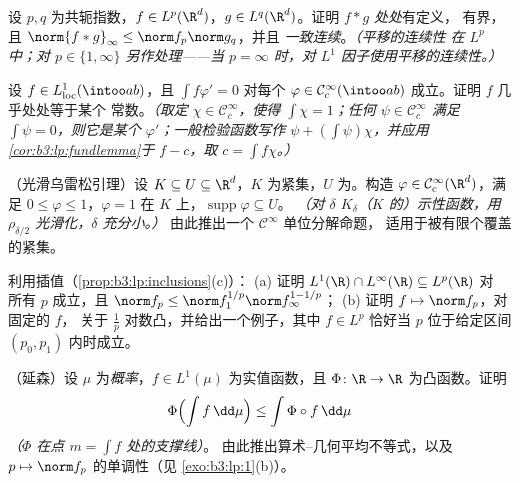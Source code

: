 \begin{exercise}[$\star\star$]\label{exo:b3:lp:6}
设 $p, q$ 为共轭指数，$f \in L^p(\R^d)$，$g \in
L^q(\R^d)$。证明 $f * g$ \emph{处处}有定义，
有界，且 $\norm{f*g}_\infty \leq \norm f_p\norm g_q$，并且
\emph{一致连续}。\emph{（平移的连续性
在 $L^p$ 中；对 $p \in \{1, \infty\}$ 另作处理——当 $p =
\infty$ 时，对 $L^1$ 因子使用平移的连续性。）}
\end{exercise}

\begin{exercise}[$\star\star$]\label{exo:b3:lp:7}
设 $f \in L^1_{\mathrm{loc}}(\intoo ab)$，且
$\int f\varphi' = 0$ 对每个 $\varphi \in \mathcal
C^\infty_c(\intoo ab)$ 成立。证明 $f$ 几乎处处等于某个
常数。\emph{（取定 $\chi \in \mathcal C_c^\infty$，使得
$\int\chi = 1$；任何 $\psi \in \mathcal C_c^\infty$ 满足
$\int\psi = 0$，则它是某个 $\varphi'$；一般检验函数写作
$\psi + (\int\psi)\chi$，并应用
\cref{cor:b3:lp:fundlemma}于 $f - c$，取 $c = \int
f\chi$。）}
\end{exercise}

\begin{exercise}[$\star\star\star$]\label{exo:b3:lp:8}
（光滑乌雷松引理）设 $K \subseteq U \subseteq \R^d$，$K$
为紧集，$U$ 为。构造 $\varphi \in \mathcal
C^\infty_c(\R^d)$，满足 $0 \leq \varphi \leq 1$，$\varphi = 1$
在 $K$ 上，$\operatorname{supp}\varphi \subseteq U$。
\emph{（对 $\delta$ 
$K_\delta$（$K$ 的）示性函数，用 $\rho_{\delta/2}$ 光滑化，$\delta$ 充分小。）}
由此推出一个 $\mathcal C^\infty$ 单位分解命题，
适用于被有限个覆盖的紧集。
\end{exercise}

\begin{exercise}[$\star\star$]\label{exo:b3:lp:9}
利用插值（\cref{prop:b3:lp:inclusions}(c)）：
(a) 证明 $L^1(\R)\cap L^\infty(\R) \subseteq L^p(\R)$ 对
所有 $p$ 成立，且 $\norm f_p \leq \norm f_1^{1/p}\norm
f_\infty^{1 - 1/p}$；
(b) 证明 $f \mapsto \norm f_p$，对固定的 $f$，
关于 $\frac1p$ 对数凸，并给出一个例子，其中 $f \in L^p$
恰好当 $p$ 位于给定区间 $(p_0, p_1)$ 内时成立。
\end{exercise}

\begin{exercise}[$\star\star$]\label{exo:b3:lp:10}
（延森）设 $\mu$ 为\emph{概率}，$f \in
L^1(\mu)$ 为实值函数，且 $\Phi \colon \R \to \R$ 为凸函数。证明
\[
\Phi\Bigl(\int f\,\dd\mu\Bigr) \leq \int \Phi\circ
f\,\dd\mu
\]
\emph{（$\Phi$ 在点 $m = \int f$ 处的支撑线）}。
由此推出算术–几何平均不等式，以及
$p \mapsto \norm f_p$ 的单调性（见
\cref{exo:b3:lp:1}(b)）。
\end{exercise}

